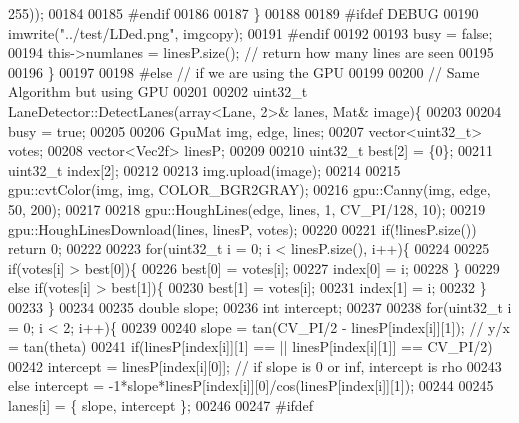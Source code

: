 \begin{DoxyCode}
      255));
00184 
00185         \textcolor{preprocessor}{#}\textcolor{preprocessor}{endif}
00186 
00187     \}
00188 
00189     \textcolor{preprocessor}{#}\textcolor{preprocessor}{ifdef} \textcolor{preprocessor}{DEBUG}
00190     imwrite(\textcolor{stringliteral}{"../test/LDed.png"}, imgcopy);
00191     \textcolor{preprocessor}{#}\textcolor{preprocessor}{endif}
00192 
00193     busy = \textcolor{keyword}{false};
00194     \textcolor{keyword}{this}->numlanes = linesP.size();  \textcolor{comment}{// return how many lines are seen}
00195 
00196 \}
00197 
00198 \textcolor{preprocessor}{#}\textcolor{preprocessor}{else} \textcolor{comment}{// if we are using the GPU}
00199 
00200 \textcolor{comment}{// Same Algorithm but using GPU}
00201 
00202 uint32\_t LaneDetector::DetectLanes(array<Lane, 2>& lanes, Mat& image)\{
00203 
00204     busy = \textcolor{keyword}{true};
00205 
00206     GpuMat img, edge, lines;
00207     vector<uint32\_t> votes;
00208     vector<Vec2f> linesP;
00209 
00210     uint32\_t best[2] = \{0\};
00211     uint32\_t index[2];
00212 
00213     img.upload(image);
00214 
00215     gpu::cvtColor(img, img, COLOR\_BGR2GRAY);
00216     gpu::Canny(img, edge, 50, 200);
00217 
00218     gpu::HoughLines(edge, lines, 1,  CV\_PI/128, 10);
00219     gpu::HoughLinesDownload(lines, linesP, votes);
00220 
00221     \textcolor{keywordflow}{if}(!linesP.size()) \textcolor{keywordflow}{return} 0;
00222 
00223     \textcolor{keywordflow}{for}(uint32\_t i = 0; i < linesP.size(), i++)\{
00224 
00225         \textcolor{keywordflow}{if}(votes[i] > best[0])\{
00226             best[0] = votes[i];
00227             index[0] = i;
00228         \}
00229         \textcolor{keywordflow}{else} \textcolor{keywordflow}{if}(votes[i] > best[1])\{
00230             best[1] = votes[i];
00231             index[1] = i;
00232         \}
00233     \}
00234 
00235     \textcolor{keywordtype}{double} slope;
00236     \textcolor{keywordtype}{int} intercept;
00237 
00238     \textcolor{keywordflow}{for}(uint32\_t i = 0; i < 2; i++)\{
00239 
00240         slope = tan(CV\_PI/2 - linesP[index[i]][1]); \textcolor{comment}{// y/x = tan(theta)}
00241         \textcolor{keywordflow}{if}(linesP[index[i]][1] == || linesP[index[i][1]] == CV\_PI/2)
00242             intercept = linesP[index[i][0]];  \textcolor{comment}{// if slope is 0 or inf, intercept is rho}
00243         \textcolor{keywordflow}{else} intercept = -1*slope*linesP[index[i]][0]/cos(linesP[index[i]][1]);
00244 
00245         lanes[i] = \{ slope, intercept \};
00246 
00247         \textcolor{preprocessor}{#}\textcolor{preprocessor}{ifdef}

\end{DoxyCode}
